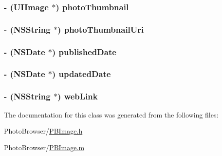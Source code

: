 \label{interface_p_b_image_afd02dd84e4335a88dfb40fa243268f85}
\hypertarget{interface_p_b_image_a246f847f78ea171cf4cce2e6dda32725}{
\subsubsection[{photoThumbnail}]{\setlength{\rightskip}{0pt plus 5cm}-\/ (UIImage $\ast$) photoThumbnail}}
\label{interface_p_b_image_a246f847f78ea171cf4cce2e6dda32725}
\hypertarget{interface_p_b_image_a68ff9e3c26d377921ce02942d15f7fbb}{
\subsubsection[{photoThumbnailUri}]{\setlength{\rightskip}{0pt plus 5cm}-\/ ({\bf NSString} $\ast$) photoThumbnailUri}}
\label{interface_p_b_image_a68ff9e3c26d377921ce02942d15f7fbb}
\hypertarget{interface_p_b_image_a7c9e348da15c9c34c347bcc1bafd6fa2}{
\subsubsection[{publishedDate}]{\setlength{\rightskip}{0pt plus 5cm}-\/ (NSDate $\ast$) publishedDate}}
\label{interface_p_b_image_a7c9e348da15c9c34c347bcc1bafd6fa2}
\hypertarget{interface_p_b_image_ad3d43ed4d30cf7a94aea5bd5ae7e0671}{
\subsubsection[{updatedDate}]{\setlength{\rightskip}{0pt plus 5cm}-\/ (NSDate $\ast$) updatedDate}}
\label{interface_p_b_image_ad3d43ed4d30cf7a94aea5bd5ae7e0671}
\hypertarget{interface_p_b_image_ad8ac8644eb2e6a0a2b963a0242235562}{
\subsubsection[{webLink}]{\setlength{\rightskip}{0pt plus 5cm}-\/ ({\bf NSString} $\ast$) webLink}}
\label{interface_p_b_image_ad8ac8644eb2e6a0a2b963a0242235562}


The documentation for this class was generated from the following files:\begin{DoxyCompactItemize}
\item 
PhotoBrowser/\hyperlink{_p_b_image_8h}{PBImage.h}\item 
PhotoBrowser/\hyperlink{_p_b_image_8m}{PBImage.m}\end{DoxyCompactItemize}
